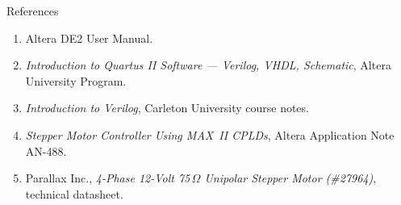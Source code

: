 \begin{labsection}{References}{}
  \begin{enumerate}
    \item Altera DE2 User Manual.
    \item \textit{Introduction to Quartus II Software --- Verilog, VHDL, Schematic}, Altera University Program.
    \item \textit{Introduction to Verilog}, Carleton University course notes.
    \item \textit{Stepper Motor Controller Using MAX~II CPLDs}, Altera Application Note AN-488.
    \item Parallax Inc., \textit{4-Phase 12-Volt 75$\,\Omega$ Unipolar Stepper Motor (\#27964)}, technical datasheet.
  \end{enumerate}
\end{labsection}
